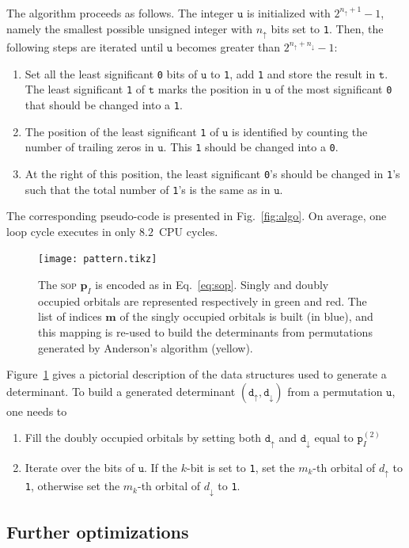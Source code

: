 \documentclass[aip,jcp,reprint,showkeys]{revtex4-1}
\newcommand{\tu}{\mathtt{u}}
\newcommand{\ttt}{\mathtt{t}}
\newcommand{\md}{\mathtt{d}}
\newcommand{\mpp}{\mathtt{p}}
\newcommand{\mpv}{\mathbf{p}}
\newcommand{\up}{\uparrow}
\newcommand{\dn}{\downarrow}
\newcommand{\one}{{\texttt{1}}}
\newcommand{\zero}{{\texttt{0}}}
\newcommand{\sop}{\textsc{sop}}
\begin{document}
The algorithm proceeds as follows. The integer $\tu$ is initialized with
$2^{n_\up+1}-1$, namely the smallest possible unsigned integer with $n_\up$
bits set to \one. 
Then, the following steps are iterated until $\tu$ becomes
greater than $2^{n_\up+n_\dn}-1$:
\begin{enumerate}
    \item Set all the least significant \zero{} bits of $\tu$ to \one{}, add \one{} and store the result in $\ttt$. The least significant \one{} of $\ttt$ marks the position in $\tu$ of the most significant \zero{} that should be changed into a \one{}.
    \item The position of the least significant \one{} of $\tu$ is identified by counting the number of trailing zeros in $\tu$. This \one{} should be changed into a \zero{}.
    \item At the right of this position, the least significant \zero's should be changed in \one's such that the total number of \one's is the same as in $\tu$.
\end{enumerate}
The corresponding pseudo-code is presented in Fig.~\ref{fig:algo}. On average, one loop cycle executes in only $8.2$~CPU cycles.

\begin{figure}[t]
\texttt{[image: pattern.tikz]} 
\caption{The {\sop} $\mpv_I$ is encoded as in Eq.~\eqref{eq:sop}. Singly and doubly
occupied orbitals are represented respectively in green and red.
The list of indices $\mathbf{m}$ of the singly occupied orbitals is built (in blue), and this
mapping is re-used to build the determinants from permutations generated by Anderson's algorithm (yellow).}
\label{fig:mapping}
\end{figure}

Figure~\ref{fig:mapping} gives a pictorial description of the data structures used to generate a determinant.
To build a generated determinant $(\md_\up,\md_\dn)$ from a permutation $\tu$, one needs to
\begin{enumerate}
    \item Fill the doubly occupied orbitals by setting both $\md_\up$ and $\md_\dn$
          equal to $\mpp_I^{(2)}$
    \item Iterate over the bits of $\tu$. If the $k$-bit is set to \one{}, set the $m_k$-th orbital of $d_\up$ to \one, otherwise set the $m_k$-th orbital of $d_\dn$ to \one.
\end{enumerate}

\subsection{Further optimizations}
\end{document}
